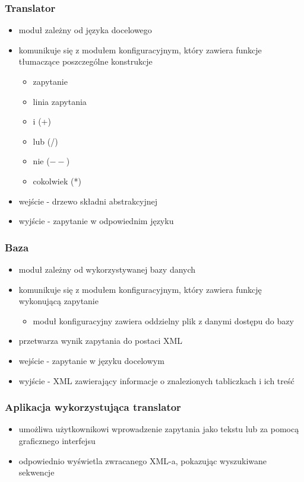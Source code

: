 \documentclass[xcolor=dvipsnames,10pt]{beamer}
\begin{document}
\begin{frame}
     \frametitle{Translator}
     
\begin{itemize}
\item moduł zależny od języka docelowego
\item komunikuje się z modułem konfiguracyjnym, który zawiera funkcje tłumaczące poszczególne konstrukcje
\begin{itemize}
\item zapytanie
\item linia zapytania
\item i (+)
\item lub (/)
\item nie ($--$)
\item cokolwiek (*)
\end{itemize}
\item wejście - drzewo składni abstrakcyjnej
\item wyjście - zapytanie w odpowiednim języku

\end{itemize}


\end{frame}

\begin{frame}
     \frametitle{Baza}
     
\begin{itemize}
\item moduł zależny od wykorzystywanej bazy danych
\item komunikuje się z modułem konfiguracyjnym, który zawiera funkcję wykonującą zapytanie
\begin{itemize}
\item moduł konfiguracyjny zawiera oddzielny plik z danymi dostępu do bazy
\end{itemize}
\item przetwarza wynik zapytania do postaci XML
\item wejście - zapytanie w języku docelowym
\item wyjście - XML zawierający informacje o znalezionych tabliczkach i ich treść

\end{itemize}

\end{frame}

\begin{frame}
     \frametitle{Aplikacja wykorzystująca translator}
   
\begin{itemize}
\item umożliwa użytkownikowi wprowadzenie zapytania jako tekstu lub za pomocą graficznego interfejsu
\item odpowiednio wyświetla zwracanego XML-a, pokazując wyszukiwane sekwencje
\end{itemize}

\end{frame}
\end{document}
